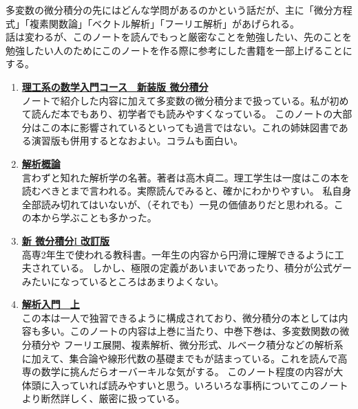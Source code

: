 \documentclass[a4j,dvipdfmx]{jsarticle}
\begin{document}
        多変数の微分積分の先にはどんな学問があるのかという話だが、主に「微分方程式」「複素関数論」「ベクトル解析」「フーリエ解析」があげられる。\\

        話は変わるが、このノートを読んでもっと厳密なことを勉強したい、先のことを勉強したい人のためにこのノートを作る際に参考にした書籍を一部上げることにする。
        \begin{enumerate}\setcounter{enumi}{0}\renewcommand{\labelenumi}{(\arabic{enumi})}
            \item \href{https://www.iwanami.co.jp/book/b482316.html}{\textbf{理工系の数学入門コース　新装版 微分積分}}\\ノートで紹介した内容に加えて多変数の微分積分まで扱っている。私が初めて読んだ本でもあり、初学者でも読みやすくなっている。
            このノートの大部分はこの本に影響されているといっても過言ではない。これの姉妹図書である演習版も併用するとなおよい。コラムも面白い。
            \item \href{https://www.iwanami.co.jp/book/b265489.html}{\textbf{解析概論}}\\言わずと知れた解析学の名著。著者は高木貞二。理工学生は一度はこの本を読むべきとまで言われる。実際読んでみると、確かにわかりやすい。
            私自身全部読み切れてはいないが、（それでも）一見の価値ありだと思われる。この本から学ぶことも多かった。
            \item \href{https://www.dainippon-tosho.co.jp/college_math/differential1.html}{\textbf{新 微分積分}I \textbf{改訂版}}\\高専2年生で使われる教科書。一年生の内容から円滑に理解できるように工夫されている。
            しかし、極限の定義があいまいであったり、積分が公式ゲーみたいになっているところはあまりよくない。
            \item \href{https://www.iwanami.co.jp/book/b378350.html}{\textbf{解析入門　上}}\\この本は一人で独習できるように構成されており、微分積分の本としては内容も多い。このノートの内容は上巻に当たり、中巻下巻は、多変数関数の微分積分や
            フーリエ展開、複素解析、微分形式、ルベーク積分などの解析系に加えて、集合論や線形代数の基礎までもが詰まっている。これを読んで高専の数学に挑んだらオーバーキルな気がする。
            このノート程度の内容が大体頭に入っていれば読みやすいと思う。いろいろな事柄についてこのノートより断然詳しく、厳密に扱っている。
        \end{enumerate}
    \clearpage
\end{document}
